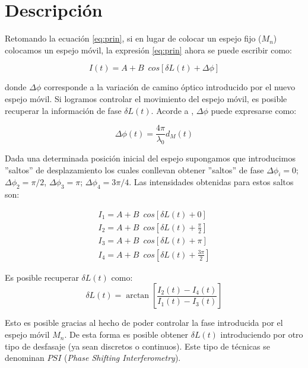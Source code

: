 \section{Descripción}
\label{sec:descrip}

Retomando la ecuación \ref{eq:prin}, si en lugar de colocar un espejo fijo ($M_n$) colocamos un espejo móvil, la expresión \ref{eq:prin} ahora se puede escribir como:

\begin{equation}
I(t) = A + B \enspace cos[\delta L(t) + \Delta \phi]
\label{eq:prin_mov}
\end{equation}

donde $\Delta \phi$ corresponde a la variación de camino óptico introducido por el nuevo espejo móvil. Si logramos controlar el movimiento del espejo móvil, es posible recuperar la información de fase $\delta L(t)$. Acorde a \cite{ob:hechtoptics}, $\Delta \phi$ puede expresarse como:

\begin{equation}
\Delta \phi(t) = \frac{4 \pi}{\lambda_0} d_M (t)
\end{equation}

Dada una determinada posición inicial del espejo supongamos que introducimos ''saltos'' de desplazamiento los cuales conllevan obtener ''saltos'' de fase $\Delta \phi_i = 0$; $\Delta \phi_2 = \pi / 2$, $\Delta \phi_3 = \pi$; $\Delta \phi_4 = 3\pi / 4$. Las intensidades obtenidas para estos saltos son:

\begin{gather}
I_1=A + B \enspace cos[\delta L(t) + 0] \\
I_2=A + B \enspace cos[\delta L(t) + \frac{\pi}{2}] \\
I_3=A + B \enspace cos[\delta L(t) +\pi] \\
I_4=A + B \enspace cos[\delta L(t) + \frac{3\pi}{2}] 
\end{gather}

Es posible recuperar $\delta L(t)$ como:
\begin{equation}
\delta L(t) = \arctan\left[\frac{I_2 (t) - I_4 (t)}{I_1 (t) - I_3 (t)}\right]
\end{equation}

Esto es posible gracias al hecho de poder controlar la fase introducida por el espejo móvil $M_n$. De esta forma es posible obtener $\delta L (t)$ introduciendo por otro tipo de desfasaje (ya sean discretos o continuos). Este tipo de técnicas se denominan $PSI$ (\textit{Phase Shifting Interferometry}).


